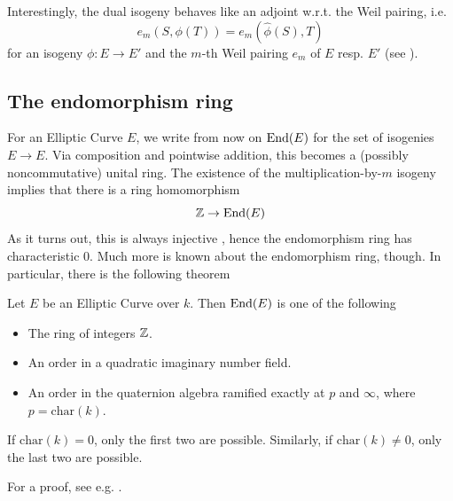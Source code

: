 Interestingly, the dual isogeny behaves like an adjoint w.r.t. the Weil pairing, i.e.
\begin{equation*}
    e_m(S, \phi(T)) = e_m(\hat{\phi}(S), T)
\end{equation*}
for an isogeny $\phi: E \to E'$ and the $m$-th Weil pairing $e_m$ of $E$ resp. $E'$ (see \cite[Prop.~III.8.2]{arithmetic_elliptic_curves}).

\subsection{The endomorphism ring}
For an Elliptic Curve $E$, we write from now on $\mathrm{End}(E)$ for the set of isogenies $E \to E$.
Via composition and pointwise addition, this becomes a (possibly noncommutative) unital ring.
The existence of the multiplication-by-$m$ isogeny implies that there is a ring homomorphism
\begin{equation*}
    \mathbb{Z} \to \mathrm{End}(E)
\end{equation*}
As it turns out, this is always injective \cite[Prop.~III.4.2]{arithmetic_elliptic_curves}, hence the endomorphism ring has characteristic 0.
Much more is known about the endomorphism ring, though.
In particular, there is the following theorem
\begin{theorem}
    Let $E$ be an Elliptic Curve over $k$. Then $\mathrm{End}(E)$ is one of the following
    \begin{itemize}
        \item The ring of integers $\mathbb{Z}$.
        \item An order in a quadratic imaginary number field.
        \item An order in the quaternion algebra ramified exactly at $p$ and $\infty$, where $p = \mathrm{char}(k)$.
    \end{itemize}
    If $\mathrm{char}(k) = 0$, only the first two are possible.
    Similarly, if $\mathrm{char}(k) \neq 0$, only the last two are possible. 
\end{theorem}
For a proof, see e.g. \cite[Corollary~III.9.4]{arithmetic_elliptic_curves}.

